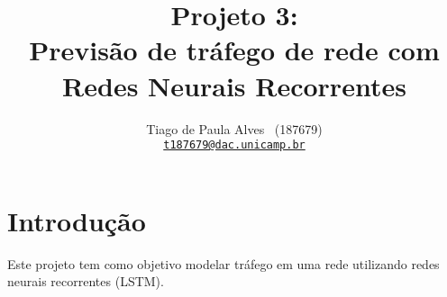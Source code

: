 \documentclass{homework}
\title{
    \vspace{-2\baselineskip}
    Projeto 3: \\
    {\Large Previsão de tráfego de rede com Redes Neurais Recorrentes}
}
\author{
    Tiago de Paula Alves ~(187679) \\
    \href{mailto:t187679@dac.unicamp.br}{\texttt{t187679@dac.unicamp.br}}%
}
\begin{document}
\maketitle\thispagestyle{fancy}
\vspace{-3em}

\pagestyle{main}

\section{Introdução}

Este projeto tem como objetivo modelar tráfego em uma rede utilizando redes neurais recorrentes (LSTM).
\end{document}
